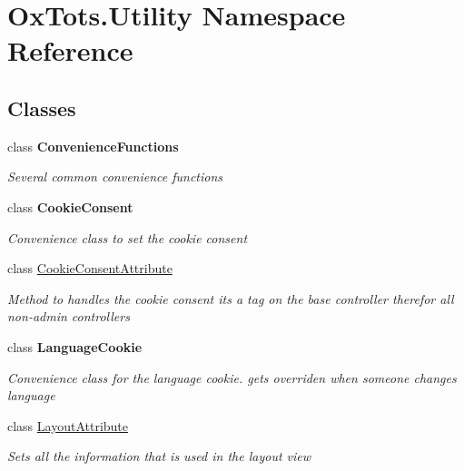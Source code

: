 \hypertarget{namespace_ox_tots_1_1_utility}{}\section{Ox\+Tots.\+Utility Namespace Reference}
\label{namespace_ox_tots_1_1_utility}
\subsection*{Classes}
\begin{DoxyCompactItemize}
\item 
class {\bfseries Convenience\+Functions}
\begin{DoxyCompactList}\small\item\em Several common convenience functions \end{DoxyCompactList}\item 
class {\bfseries Cookie\+Consent}
\begin{DoxyCompactList}\small\item\em Convenience class to set the cookie consent \end{DoxyCompactList}\item 
class \mbox{\hyperlink{class_ox_tots_1_1_utility_1_1_cookie_consent_attribute}{Cookie\+Consent\+Attribute}}
\begin{DoxyCompactList}\small\item\em Method to handles the cookie consent it\textquotesingle{}s a tag on the base controller therefor all non-\/admin controllers \end{DoxyCompactList}\item 
class {\bfseries Language\+Cookie}
\begin{DoxyCompactList}\small\item\em Convenience class for the language cookie. gets overriden when someone changes language \end{DoxyCompactList}\item 
class \mbox{\hyperlink{class_ox_tots_1_1_utility_1_1_layout_attribute}{Layout\+Attribute}}
\begin{DoxyCompactList}\small\item\em Sets all the information that is used in the layout view \end{DoxyCompactList}\end{DoxyCompactItemize}
